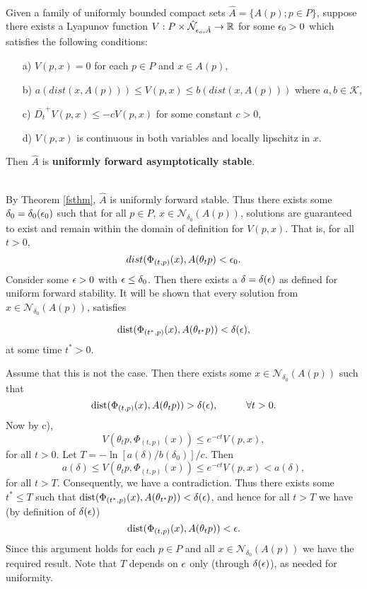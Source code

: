 \begin{therm} \hfill \\
\label{fasthm}
  Given a family of uniformly bounded compact sets $\hat{A} = \{A(p);p
  \in P \}$, suppose there exists a Lyapunov function $V: P \times
  \hat{\mathcal{N}}_{\epsilon_o, \hat{A}} \to \mathbb{R}$ for some $\epsilon_0 > 0$ which
  satisfies the following conditions:
\begin{itemize}
  \item[a)] $V(p, x) = 0$ for each $p \in P$ and $x \in A(p),$
  \item[b)] $a(dist( x, A(p))) \leq V(p, x) \leq b( dist( x, A(p)))$
    where $a, b \in \mathcal{K}$,
  \item[c)] $\overline{D_t}^+ V(p, x) \leq -cV(p, x)$ for some constant $c >
    0$,
  \item[d)] $V(p, x)$ is continuous in both variables and locally lipschitz in
    $x$.
\end{itemize}
Then $\hat{A}$ is \textbf{uniformly forward asymptotically stable}.
\end{therm}
\begin{prf} \hfill \\
  By Theorem \ref{fsthm}, $\hat{A}$ is uniformly forward stable. Thus there
  exists some $\delta_0 = \delta_0(\epsilon_0)$ such that for all $p \in P$, $x \in
  \mathcal{N}_{\delta_0}(A(p))$, solutions are guaranteed to exist
  and remain within the domain of definition for $V(p, x)$. That is, for all
  $t > 0$,
  \[ dist( \Phi_{(t,p)}(x), A(\theta_{t}p) < \epsilon_0. \]
  Consider some $\epsilon > 0$ with $\epsilon \leq \delta_0$. Then there exists
  a $\delta = \delta(\epsilon)$ as defined for uniform forward stability. It will be
  shown that every solution from $x \in \mathcal{N}_{\delta_0}(A(p))$,
  satisfies

  \[ {\rm dist}(\Phi_{(t^*, p)}(x),A(\theta_{t^*}p)) < \delta(\epsilon), \]
  at some time $t^* > 0$.

  Assume that this is not the case. Then there exists some
  $x \in \mathcal{N}_{\delta_0}(A(p))$ such that
  \[ {\rm dist}(\Phi_{(t, p)}(x),A(\theta_{t}p)) > \delta(\epsilon), \hspace{1cm} \forall
   t > 0. \]
  Now by c),
  \[ V( \theta_t p, \Phi_{(t, p)}(x)) \leq e^{-ct}V(p, x), \]
  for all $t>0$. Let $\displaystyle T = - \ln [
  a(\delta)/b(\delta_0) ] /c  $. Then
  \[ a(\delta) \leq V( \theta_t p, \Phi_{(t, p)}(x)) \leq e^{-ct}V(p, x) <
    a(\delta), \]
  for all $t > T$. Consequently,  we have a contradiction. Thus there exists
  some $t^* \leq T$   such that ${\rm dist}(\Phi_{(t^*, p)}(x),A(\theta_{t^*}p)) <
  \delta(\epsilon)$, and  hence for all $t > T$ we have (by definition of
   $\delta(\epsilon)$)
  \[ {\rm dist}(\Phi_{(t, p)}(x),A(\theta_{t}p)) < \epsilon. \]
  Since this argument holds for each $p \in P$ and all $x \in
  \mathcal{N}_{\delta_0}(A(p))$ we have the required result. Note that $T$
  depends on $\epsilon$ only (through $\delta(\epsilon)$), as needed for uniformity.
\end{prf}

